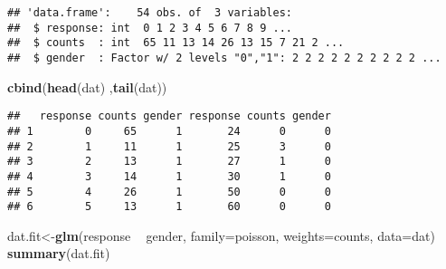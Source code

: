 \documentclass[]{article}
\newenvironment{Shaded}{\begin{snugshade}}{\end{snugshade}}
\newcommand{\KeywordTok}[1]{\textcolor[rgb]{0.13,0.29,0.53}{\textbf{#1}}}
\newcommand{\DataTypeTok}[1]{\textcolor[rgb]{0.13,0.29,0.53}{#1}}
\newcommand{\DecValTok}[1]{\textcolor[rgb]{0.00,0.00,0.81}{#1}}
\newcommand{\CharTok}[1]{\textcolor[rgb]{0.31,0.60,0.02}{#1}}
\newcommand{\StringTok}[1]{\textcolor[rgb]{0.31,0.60,0.02}{#1}}
\newcommand{\OperatorTok}[1]{\textcolor[rgb]{0.81,0.36,0.00}{\textbf{#1}}}
\newcommand{\NormalTok}[1]{#1}
\begin{document}
\begin{Shaded}
\end{Shaded}

\begin{verbatim}
## 'data.frame':    54 obs. of  3 variables:
##  $ response: int  0 1 2 3 4 5 6 7 8 9 ...
##  $ counts  : int  65 11 13 14 26 13 15 7 21 2 ...
##  $ gender  : Factor w/ 2 levels "0","1": 2 2 2 2 2 2 2 2 2 2 ...
\end{verbatim}

\begin{Shaded}
\begin{Highlighting}[]
\KeywordTok{cbind}\NormalTok{(}\KeywordTok{head}\NormalTok{(dat) ,}\KeywordTok{tail}\NormalTok{(dat))}
\end{Highlighting}
\end{Shaded}

\begin{verbatim}
##   response counts gender response counts gender
## 1        0     65      1       24      0      0
## 2        1     11      1       25      3      0
## 3        2     13      1       27      1      0
## 4        3     14      1       30      1      0
## 5        4     26      1       50      0      0
## 6        5     13      1       60      0      0
\end{verbatim}

\begin{Shaded}
\begin{Highlighting}[]
\NormalTok{dat.fit<-}\KeywordTok{glm}\NormalTok{(response }\OperatorTok{~}\StringTok{ }\NormalTok{gender, }\DataTypeTok{family=}\NormalTok{poisson, }\DataTypeTok{weights=}\NormalTok{counts, }\DataTypeTok{data=}\NormalTok{dat) }
\KeywordTok{summary}\NormalTok{(dat.fit)}
\end{Highlighting}
\end{Shaded}
\end{document}
